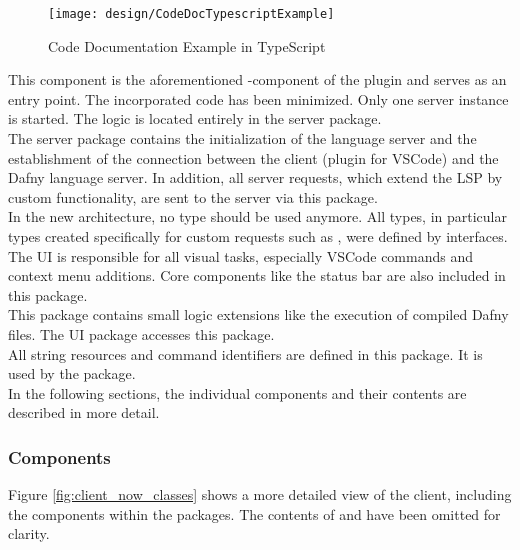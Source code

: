 \begin{figure}[H]
    \centering
    \texttt{[image: design/CodeDocTypescriptExample]}
    \caption{Code Documentation Example in TypeScript}
    \label{fig:CodeDocTypescriptExample}
\end{figure}

{\bf {}} \textendash{}
This component is the aforementioned -component of the plugin and serves as an entry point.
The incorporated code has been minimized.
Only one server instance is started.
The logic is located entirely in the server package.\\

{\bf {}} \textendash{}
The server package contains the initialization of the language server and the establishment of the connection between the client (plugin for VSCode) and the Dafny language server.
In addition, all server requests, which extend the LSP by custom functionality, are sent to the server via this package.\\

{\bf {}} \textendash{}
In the new architecture, no  type should be used anymore.
All types, in particular types created specifically for custom requests such as , were defined by interfaces. \\

{\bf {}} \textendash{}
The UI is responsible for all visual tasks, especially VSCode commands and context menu additions.
Core components like the status bar are also included in this package.\\

{\bf {}} \textendash{}
This package contains small logic extensions like the execution of compiled Dafny files.
The UI package accesses this package.\\

{\bf {}} \textendash{}
All string resources and command identifiers are defined in this package.
It is used by the  package. \\

In the following sections, the individual components and their contents are described in more detail.

\subsubsection{Components}
Figure \ref{fig:client_now_classes} shows a more detailed view of the client, including the components within the packages.
The contents of  and  have been omitted for clarity.\\

